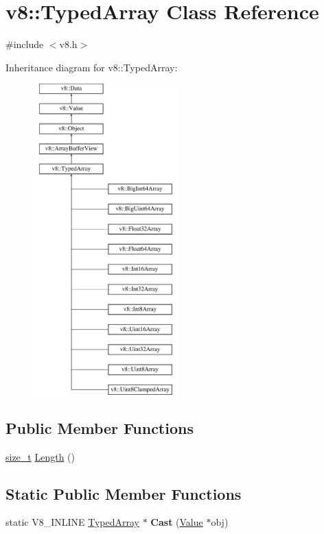 \hypertarget{classv8_1_1TypedArray}{}\section{v8\+:\+:Typed\+Array Class Reference}
\label{classv8_1_1TypedArray}


{\ttfamily \#include $<$v8.\+h$>$}

Inheritance diagram for v8\+:\+:Typed\+Array\+:\begin{figure}[H]
\begin{center}
\leavevmode
\includegraphics[height=12.000000cm]{classv8_1_1TypedArray}
\end{center}
\end{figure}
\subsection*{Public Member Functions}
\begin{DoxyCompactItemize}
\item 
\mbox{\hyperlink{classsize__t}{size\+\_\+t}} \mbox{\hyperlink{classv8_1_1TypedArray_abb1047225d53d960c0da9c9f83cd7042}{Length}} ()
\end{DoxyCompactItemize}
\subsection*{Static Public Member Functions}
\begin{DoxyCompactItemize}
\item 
\mbox{\label{classv8_1_1TypedArray_ac3f23cc8171d3be0815df7731140382f}} 
static V8\+\_\+\+I\+N\+L\+I\+NE \mbox{\hyperlink{classv8_1_1TypedArray}{Typed\+Array}} $\ast$ {\bfseries Cast} (\mbox{\hyperlink{classv8_1_1Value}{Value}} $\ast$obj)
\end{DoxyCompactItemize}
